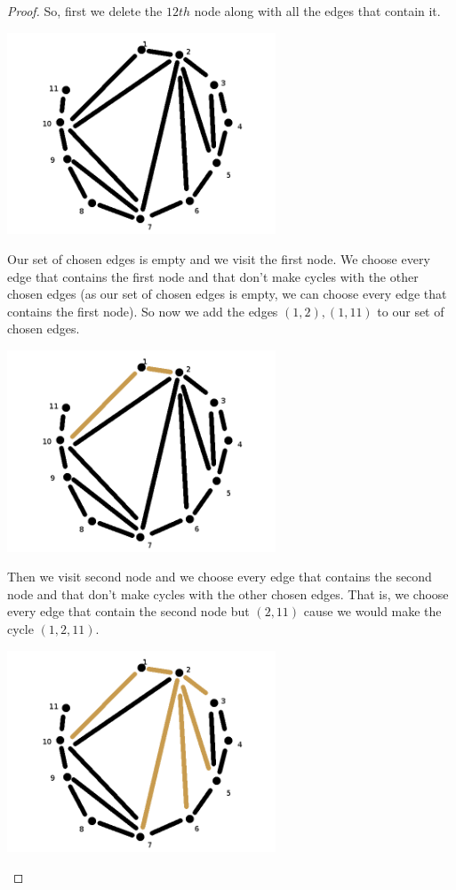 \begin{proof}
    So, first we delete the $12th$ node along with all the edges that contain it. 
    \begin{center}
        \includegraphics[width=8cm]{Homework1/Problem4/TriangulationToPlanarRootedTree2.png}
    \end{center}
    
    Our set of chosen edges is empty and we visit the first node. We choose every edge that contains the first node and that don't make cycles with
    the other chosen edges (as our set of chosen edges is empty, we can choose every edge that contains the first node). So now we add the edges 
    $(1, 2), (1, 11)$ to our set of chosen edges.
    \begin{center}
        \includegraphics[width=8cm]{Homework1/Problem4/TriangulationToPlanarRootedTree3.png}
    \end{center}
    
    Then we visit second node and we choose every edge that contains the second node and that don't make cycles with the other chosen edges. That is, 
    we choose every edge that contain the second node but $(2, 11)$ cause we would make the cycle $(1, 2, 11)$. 
    \begin{center}
        \includegraphics[width=8cm]{Homework1/Problem4/TriangulationToPlanarRootedTree4.png}
    \end{center}
    

\end{proof}
